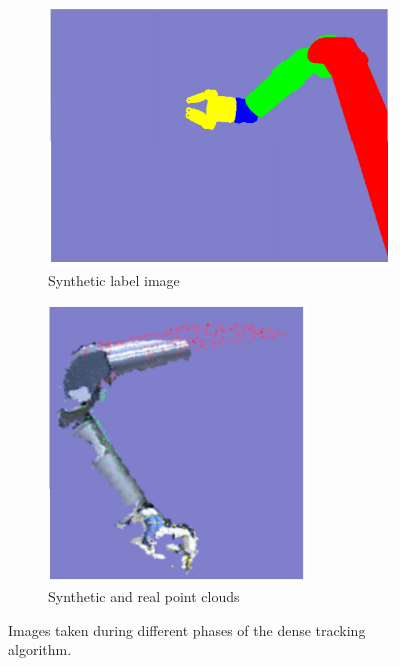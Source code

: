 \begin{figure}[ht]
\begin{subfigure}{0.45\textwidth}
		\includegraphics[width=1.0\textwidth]{img/dense_tracking/label_render}
		\caption{Synthetic label image}
	\end{subfigure}
	\begin{subfigure}{0.45\textwidth}
		\centering
		\includegraphics[width=0.75\textwidth]{img/dense_tracking/pointclouds}
		\caption{Synthetic and real point clouds}
	\end{subfigure}
	\caption{Images taken during different phases of the dense tracking algorithm.}
    \label{fig:dense_tracking}
\end{figure}

